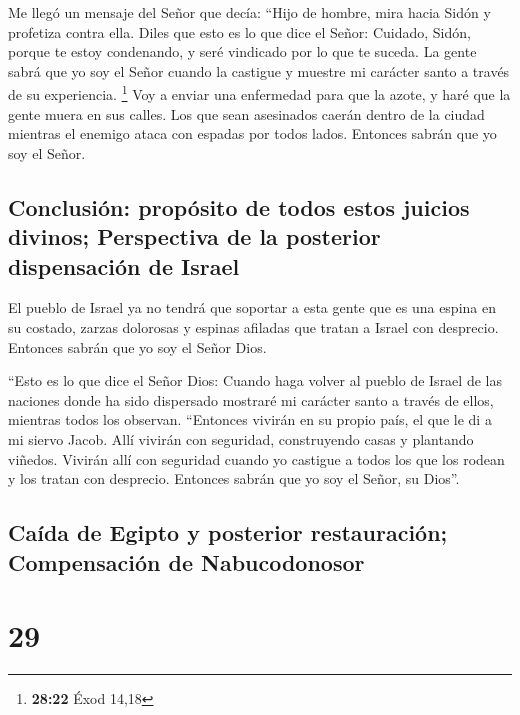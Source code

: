  Me llegó un mensaje del Señor que decía: 
``Hijo de hombre, mira hacia Sidón y profetiza contra ella.
 Diles que esto es lo que dice el Señor: Cuidado, Sidón,
porque te estoy condenando, y seré vindicado por lo que te suceda. La
gente sabrá que yo soy el Señor cuando la castigue y muestre mi carácter
santo a través de su experiencia. \footnote{\textbf{28:22} Éxod 14,18}
 Voy a enviar una enfermedad para que la azote, y haré
que la gente muera en sus calles. Los que sean asesinados caerán dentro
de la ciudad mientras el enemigo ataca con espadas por todos lados.
Entonces sabrán que yo soy el Señor.

\hypertarget{conclusiuxf3n-propuxf3sito-de-todos-estos-juicios-divinos-perspectiva-de-la-posterior-dispensaciuxf3n-de-israel}{%
\subsection{Conclusión: propósito de todos estos juicios divinos;
Perspectiva de la posterior dispensación de
Israel}\label{conclusiuxf3n-propuxf3sito-de-todos-estos-juicios-divinos-perspectiva-de-la-posterior-dispensaciuxf3n-de-israel}}

 El pueblo de Israel ya no tendrá que soportar a esta
gente que es una espina en su costado, zarzas dolorosas y espinas
afiladas que tratan a Israel con desprecio. Entonces sabrán que yo soy
el Señor Dios.

 ``Esto es lo que dice el Señor Dios: Cuando haga volver
al pueblo de Israel de las naciones donde ha sido dispersado mostraré mi
carácter santo a través de ellos, mientras todos los observan.
``Entonces vivirán en su propio país, el que le di a mi siervo Jacob.
 Allí vivirán con seguridad, construyendo casas y
plantando viñedos. Vivirán allí con seguridad cuando yo castigue a todos
los que los rodean y los tratan con desprecio. Entonces sabrán que yo
soy el Señor, su Dios''.

\hypertarget{cauxedda-de-egipto-y-posterior-restauraciuxf3n-compensaciuxf3n-de-nabucodonosor}{%
\subsection{Caída de Egipto y posterior restauración; Compensación de
Nabucodonosor}\label{cauxedda-de-egipto-y-posterior-restauraciuxf3n-compensaciuxf3n-de-nabucodonosor}}

\hypertarget{section-28}{%
\section{29}\label{section-28}}

